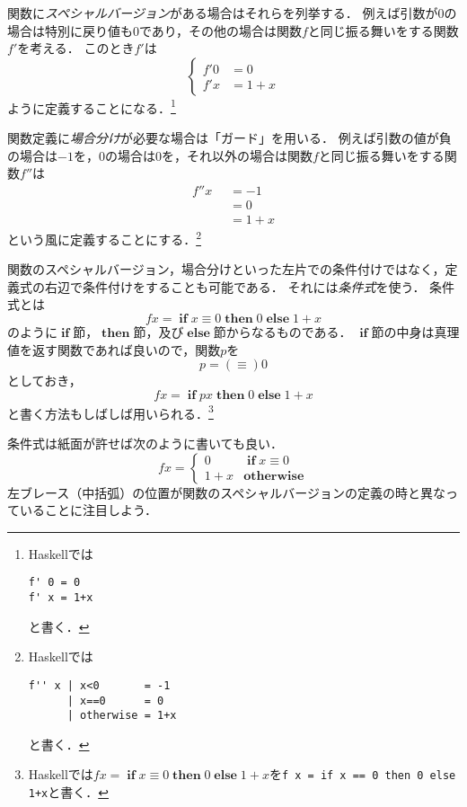 \documentclass[twocolumn]{jsbook}
\newcommand{\mathKeyword}[1]{\mathbf{#1}}
\DeclareMathOperator{\mathElse}{\mathKeyword{else}}
\DeclareMathOperator{\mathIf}{\mathKeyword{if}}
\DeclareMathOperator{\mathThen}{\mathKeyword{then}}
\newcommand{\mathOtherwise}{\mathKeyword{otherwise}}
\newcommand{\mathGuard}[1]{\mathop{\mid_{#1}}}
\newcommand{\keyword}[1]{\emph{#1}}
\newcommand{\code}[1]{\texttt{#1}}
\newcommand{\binaryeq}{\equiv}
\newcommand{\keywordname}[1]{\mathbf{#1}}
\newcommand{\keywordif}{\mathop{\keywordname{if}}}
\newcommand{\keywordthen}{\mathop{\keywordname{then}}}
\newcommand{\keywordelse}{\mathop{\keywordname{else}}}
\begin{document}
関数に\keyword{スペシャルバージョン}がある場合はそれらを列挙する．
例えば引数が$0$の場合は特別に戻り値も$0$であり，その他の場合は関数$f$と同じ振る舞いをする関数$f'$を考える．
このとき$f'$は
\begin{equation*}
\left\{
\begin{split}
f'0&=0\\
f'x&=1+x
\end{split}
\right.
\end{equation*}
ように定義することになる．\footnote{Haskellでは
\begin{Verbatim}[xleftmargin=10mm]
f' 0 = 0
f' x = 1+x
\end{Verbatim}
と書く．}

関数定義に\keyword{場合分け}が必要な場合は「ガード」を用いる．
例えば引数の値が負の場合は$-1$を，$0$の場合は$0$を，それ以外の場合は関数$f$と同じ振る舞いをする関数$f''$は
\begin{equation*}
\begin{split}
f''x&\mathGuard{x<0}=-1\\
&\mathGuard{x\equiv 0}=0\\
&\mathGuard{\mathOtherwise}=1+x
\end{split}
\end{equation*}
という風に定義することにする．\footnote{Haskellでは
\begin{Verbatim}[xleftmargin=10mm]
f'' x | x<0       = -1
      | x==0      = 0
      | otherwise = 1+x
\end{Verbatim}
と書く．}

関数のスペシャルバージョン，場合分けといった左片での条件付けではなく，定義式の右辺で条件付けをすることも可能である．
それには\keyword{条件式}を使う．
条件式とは
$$fx=\mathIf x\equiv0\mathThen0\mathElse1+x$$
のように$\mathIf$節，$\mathThen$節，及び$\mathElse$節からなるものである．
$\mathIf$節の中身は真理値を返す関数であれば良いので，関数$p$を$$p=(\equiv)0$$としておき，$$fx=\mathIf px\mathThen0\mathElse1+x$$と書く方法もしばしば用いられる．\footnote{Haskellでは$fx=\keywordif x\binaryeq0\keywordthen0\keywordelse1+x$を\code{f x = if x == 0 then 0 else 1+x}と書く．}

条件式は紙面が許せば次のように書いても良い．
\begin{equation*}
fx=\begin{cases}
0&\mathIf x\equiv0\\
1+x&\mathOtherwise
\end{cases}
\end{equation*}
左ブレース（中括弧）の位置が関数のスペシャルバージョンの定義の時と異なっていることに注目しよう．
\end{document}
